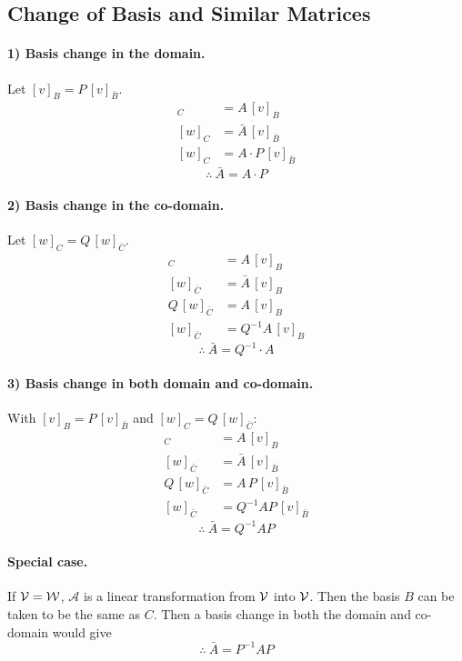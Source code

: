 \subsection{Change of Basis and Similar Matrices}\label{ss:basis-change-rep}

\paragraph{1) Basis change in the domain.} Let $[v]_B=P\,[v]_{\bar B}$.
\begin{align*}
[w]_C&=A\,[v]_B\\
[w]_C&=\bar A\,[v]_{\bar B}\\
[w]_C&=A\cdot P\,[v]_{\bar B}
\end{align*}
\[
\therefore\ \boxed{\bar A=A\cdot P}
\]

\paragraph{2) Basis change in the co-domain.} Let $[w]_C=Q\,[w]_{\bar C}$.
\begin{align*}
[w]_C&=A\,[v]_B\\
[w]_{\bar C}&=\bar A\,[v]_B\\
Q\,[w]_{\bar C}&=A\,[v]_B\\
[w]_{\bar C}&=Q^{-1}A\,[v]_B
\end{align*}
\[
\therefore\ \boxed{\bar A=Q^{-1}\cdot A}
\]

\paragraph{3) Basis change in both domain and co-domain.} With $[v]_B=P\,[v]_{\bar B}$ and $[w]_C=Q\,[w]_{\bar C}$:
\begin{align*}
[w]_C&=A\,[v]_B\\
[w]_{\bar C}&=\bar A\,[v]_{\bar B}\\
Q\,[w]_{\bar C}&=A\,P\,[v]_{\bar B}\\
[w]_{\bar C}&=Q^{-1}AP\,[v]_{\bar B}
\end{align*}
\[
\therefore\ \boxed{\bar A=Q^{-1}AP}
\]

\paragraph{Special case.}
If $\mathcal{V}=\mathcal{W}$, $\mathcal{A}$ is a linear transformation from $\mathcal{V}$ into $\mathcal{V}$. Then the basis $B$ can be taken to be the same as $C$. Then a basis change in both the domain and co-domain would give
\[
\therefore\ \boxed{\bar A=P^{-1}AP}
\]

